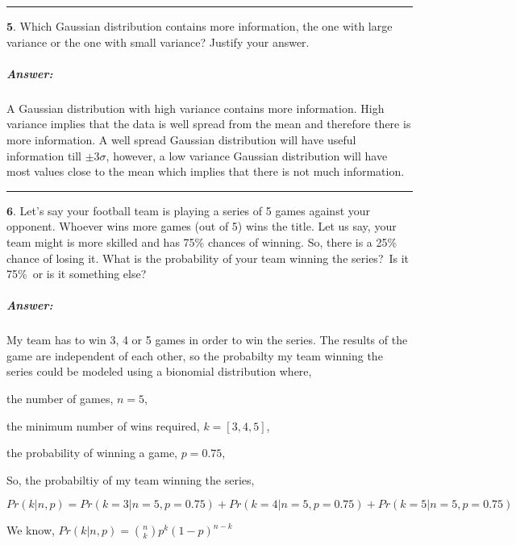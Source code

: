\documentclass[11pt]{article}
\begin{document}
    \begin{center}\rule{0.5\linewidth}{\linethickness}\end{center}

\(\textbf{5.}\) Which Gaussian distribution contains more information,
the one with large variance or the one with small variance? Justify your
answer.

    \hypertarget{answer}{%
\subparagraph{Answer:}\label{answer}}

A Gaussian distribution with high variance contains more information.
High variance implies that the data is well spread from the mean and
therefore there is more information. A well spread Gaussian distribution
will have useful information till \(\pm 3\sigma\), however, a low
variance Gaussian distribution will have most values close to the mean
which implies that there is not much information.

    \begin{center}\rule{0.5\linewidth}{\linethickness}\end{center}

\(\textbf{6}\). Let's say your football team is playing a series of 5
games against your opponent. Whoever wins more games (out of 5) wins the
title. Let us say, your team might is more skilled and has 75\% chances
of winning. So, there is a 25\% chance of losing it. What is the
probability of your team winning the series?~Is it 75\%~or is it
something else?

    \hypertarget{answer}{%
\subparagraph{Answer:}\label{answer}}

My team has to win 3, 4 or 5 games in order to win the series. The
results of the game are independent of each other, so the probabilty my
team winning the series could be modeled using a bionomial distribution
where,

the number of games, \(n = 5\),

the minimum number of wins required, \(k=[3,4,5]\),

the probability of winning a game, \(p=0.75\),

So, the probabiltiy of my team winning the series,

\(Pr(k | n,p) = Pr(k = 3 | n=5,p=0.75) + Pr(k = 4 | n=5,p=0.75) + Pr(k = 5 | n=5,p=0.75)\)

We know, \(Pr(k | n,p) = {n \choose k} p^k (1-p)^{n-k}\)
\end{document}
